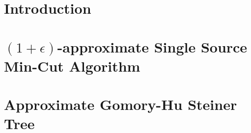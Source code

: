 \documentclass[11pt]{article}
\newcommand{\e}{\epsilon}
\newcommand{\1}{\mathbbm 1}
\begin{document}
\section{Introduction}
\label{sec:introduction}


%

\section{$(1+\e)$-approximate Single Source Min-Cut Algorithm}


\section{Approximate Gomory-Hu Steiner Tree}


\balance







%
\end{document}
